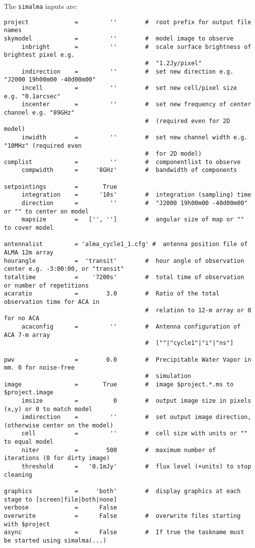 The {\tt simalma} inputs are:
\small
\begin{verbatim}
project             =         ''        #  root prefix for output file names
skymodel            =         ''        #  model image to observe
     inbright       =         ''        #  scale surface brightness of brightest pixel e.g.
                                        #  "1.2Jy/pixel"
     indirection    =         ''        #  set new direction e.g. "J2000 19h00m00 -40d00m00"
     incell         =         ''        #  set new cell/pixel size e.g. "0.1arcsec"
     incenter       =         ''        #  set new frequency of center channel e.g. "89GHz"
                                        #  (required even for 2D model)
     inwidth        =         ''        #  set new channel width e.g. "10MHz" (required even
                                        #  for 2D model)
complist            =         ''        #  componentlist to observe
     compwidth      =     '8GHz'        #  bandwidth of components

setpointings        =       True        
     integration    =      '10s'        #  integration (sampling) time
     direction      =         ''        #  "J2000 19h00m00 -40d00m00" or "" to center on model
     mapsize        =   ['', '']        #  angular size of map or "" to cover model

antennalist         = 'alma_cycle1_1.cfg' #  antenna position file of ALMA 12m array
hourangle           =  'transit'        #  hour angle of observation center e.g. -3:00:00, or "transit"
totaltime           =    '7200s'        #  total time of observation or number of repetitions
acaratio            =        3.0        #  Ratio of the total observation time for ACA in
                                        #  relation to 12-m array or 0 for no ACA
     acaconfig      =         ''        #  Antenna configuration of ACA 7-m array
                                        #  [""|"cycle1"|"i"|"ns"]

pwv                 =        0.0        #  Precipitable Water Vapor in mm. 0 for noise-free
                                        #  simulation
image               =       True        #  image $project.*.ms to $project.image
     imsize         =          0        #  output image size in pixels (x,y) or 0 to match model
     imdirection    =         ''        #  set output image direction, (otherwise center on the model)
     cell           =         ''        #  cell size with units or "" to equal model
     niter          =        500        #  maximum number of iterations (0 for dirty image)
     threshold      =   '0.1mJy'        #  flux level (+units) to stop cleaning

graphics            =     'both'        #  display graphics at each stage to [screen|file|both|none]
verbose             =      False        
overwrite           =      False        #  overwrite files starting with $project
async               =      False        #  If true the taskname must be started using simalma(...)
\end{verbatim}
\normalsize

